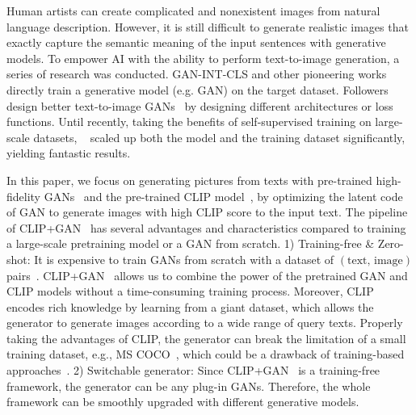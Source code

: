 \documentclass[10pt,twocolumn,letterpaper]{article}
\newcommand{\ganclip}{CLIP+GAN}
\begin{document}
\iffalse 
\red{==========}
Human artists can create complicated and nonexistent images from natural language description. 
However, it is still difficult to generate realistic images that exactly capture the semantic meaning of the input sentences with generative models.
To empower AI with the ability to perform text-to-image generation,
a series of research was conducted. 
GAN-INT-CLS \cite{reed2016generative} and other pioneering works directly train a generative model (e.g. GAN) on the target dataset. Followers design better text-to-image GANs~\cite{xu2018attngan, li2019object, tao2020df} by designing different architectures or loss functions.
Until recently, 
taking the benefits of self-supervised training on large-scale datasets,  
~\cite{ramesh2021zero, ding2021cogview} scaled up both the model and the training dataset significantly, yielding fantastic results. 

In this paper, we focus on generating pictures from texts with pre-trained high-fidelity GANs~\cite{brock2018large, karras2019style} and the pre-trained CLIP model~\cite{radford2021learning}, by optimizing the latent code of GAN to generate images with high CLIP score to the input text.
The pipeline of \ganclip~ has several advantages and characteristics compared to training a large-scale pretraining model or a GAN from scratch.
1) Training-free \& Zero-shot: 
It is expensive to train GANs from scratch with a dataset of $(\text{text, image})$ pairs~\cite{mansimov2015generating, reed2016generative, xu2018attngan, li2019object, tao2020df, ramesh2021zero}. 
\ganclip~ allows us to combine the power of the pretrained GAN and CLIP models without a time-consuming training process.
Moreover, CLIP encodes rich knowledge by learning from a giant dataset, which allows the generator to generate images according to a wide range of query texts.
Properly taking the advantages of CLIP, 
the generator can break the limitation of a small training dataset, e.g., MS COCO~\cite{lin2014microsoft}, which could be a drawback of training-based approaches~\cite{mansimov2015generating, xu2018attngan, li2019object}. 
2) Switchable generator: Since \ganclip~ is a training-free framework, the generator can be any plug-in GANs. Therefore, the whole framework can be smoothly upgraded with different generative models. 
\end{document}
